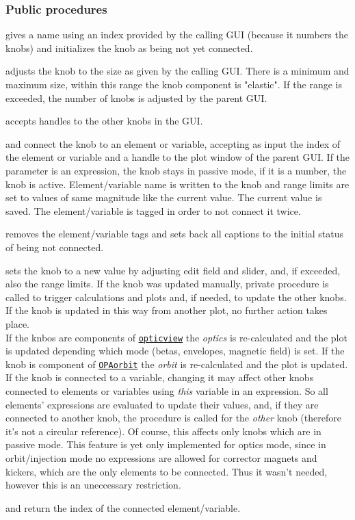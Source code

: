 \documentclass[12pt]{article}
\newcommand\code[1]{{\tt #1}}
\newcommand\guifco[1]{{\color{violet}\code{#1}}}
\newcommand{\opagui}[1]{\colorbox{blue!20}{\code{#1}}}
\newcommand{\ogui}[1]{\hyperref[#1]{\opagui{#1}}}
\newcommand{\ppro}[1]{\subsubsection*{Public procedures} #1}
\newcommand{\todo}[1]{{\color{red} #1}}
\begin{document}
\ppro{
\guifco{Init} gives a name using an index provided by the calling GUI (because it numbers the knobs) and initializes the knob as being not yet connected.

\guifco{SetSize} adjusts the knob to the size as given by the calling GUI. There is a minimum and maximum size, within this range the knob component is "elastic". If the range is exceeded, the number of knobs is adjusted by the parent GUI.

\guifco{Brotherhandles} accepts handles to the other knobs in the GUI.

\guifco{Load} and \guifco{LoadVar} connect the knob to an element or variable, accepting as input the index of the element or variable and a handle to the plot window of the parent GUI. If the parameter is an expression, the knob stays in passive mode, if it is a number, the knob is active. Element/variable name is written to the knob and range limits are set to values of same magnitude like the current value. The current value is saved. The element/variable is tagged in order to not connect it twice.

\guifco{UnLoad} removes the element/variable tags and sets back all captions to the initial status of being not connected.

\guifco{KUpdate} sets the knob to a new value by adjusting edit field and slider, and, if exceeded, also the range limits. If the knob was updated manually, private procedure \guifco{Action} is called to trigger calculations and plots and, if needed, to update the other knobs. If the knob is updated in this way from another plot, no further action takes place.\\
If the knbos are components of \ogui{opticview} the {\em optics} is re-calculated and the plot is updated depending which mode (betas, envelopes, magnetic field) is set.
If the knob is component of \ogui{OPAorbit} the {\em orbit} is re-calculated and the plot is updated.\\
If the knob is connected to a variable, changing it may affect other knobs connected to elements or variables using {\em this} variable in an expression. So all elements' expressions are evaluated to update their values, and, if they are connected to another knob, the \guifco{KUpdate} procedure is called for the {\em other} knob (therefore it's not a circular reference). Of course, this affects only knobs which are in passive mode. \todo{This feature is yet only implemented for optics mode, since in orbit/injection mode no expressions are allowed for corrector magnets and kickers, which are the only elements to be connected. Thus it wasn't needed, however this is an uneccessary restriction.}

\guifco{getella} and \guifco{getvar} return the index of the connected element/variable.
}
\end{document}
